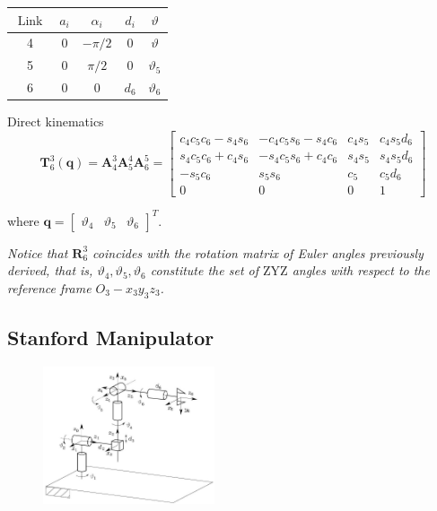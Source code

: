 \documentclass[10pt]{article}
\begin{document}
\begin{table}[h]
    \centering
\begin{tabular}{ccccc}
\hline
${\text { Link }}$ & $a_{i}$ & $\alpha_{i}$ & $d_{i}$ & $\vartheta$ \\
\hline
4 & 0 & $-\pi / 2$ & 0 & $\vartheta$ \\
5 & 0 & $\pi / 2$ & 0 & $\vartheta_{5}$ \\
6 & 0 & 0 & $d_{6}$ & $\vartheta_{6}$ \\
\hline
\end{tabular}
\end{table}





\noindent
Direct kinematics 
$$
\boldsymbol{T}_{6}^{3}(\boldsymbol{q})=\boldsymbol{A}_{4}^{3} \boldsymbol{A}_{5}^{4} \boldsymbol{A}_{6}^{5}=\left[\begin{array}{cccc}
c_{4} c_{5} c_{6}-s_{4} s_{6} & -c_{4} c_{5} s_{6}-s_{4} c_{6} & c_{4} s_{5} & c_{4} s_{5} d_{6} \\
s_{4} c_{5} c_{6}+c_{4} s_{6} & -s_{4} c_{5} s_{6}+c_{4} c_{6} & s_{4} s_{5} & s_{4} s_{5} d_{6} \\
-s_{5} c_{6} & s_{5} s_{6} & c_{5} & c_{5} d_{6} \\
0 & 0 & 0 & 1
\end{array}\right]
$$


where $\boldsymbol{q}=\left[\begin{array}{lll}\vartheta_{4} & \vartheta_{5} & \vartheta_{6}\end{array}\right]^{T}$. 

\smallskip

\emph{Notice that $\boldsymbol{R}_{6}^{3}$ coincides with the rotation matrix of Euler angles previously derived, that is, $\vartheta_{4}, \vartheta_{5}, \vartheta_{6}$ constitute the set of $\mathrm{ZYZ}$ angles with respect to the reference frame $O_{3}-x_{3} y_{3} z_{3}$.
}

\subsection{Stanford Manipulator}










\begin{figure}[H]
    \centering
    \includegraphics[max width=0.45\textwidth]{./kinematics/Stanford_manipulator}
    \label{c1.l2.fig.Stanford}
\end{figure}
\end{document}
